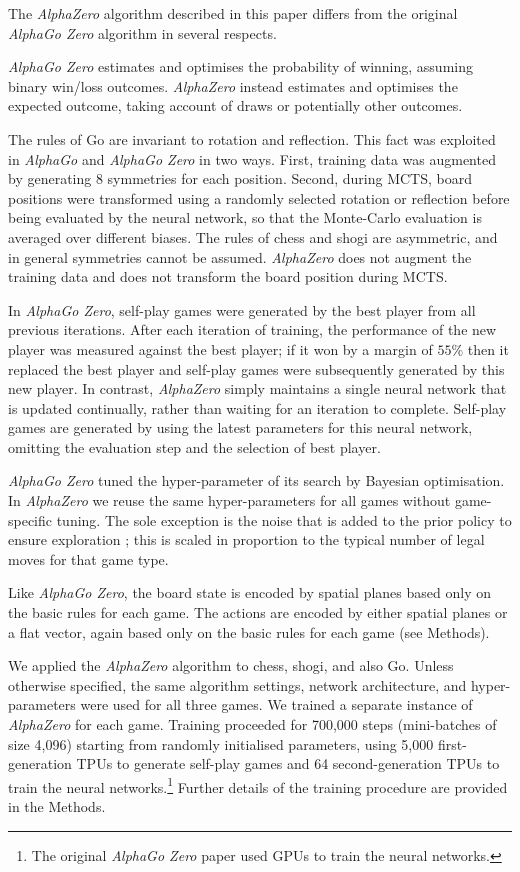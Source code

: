 \documentclass[12pt]{article}
\begin{document}
The \emph{AlphaZero} algorithm described in this paper differs from the original \emph{AlphaGo Zero} algorithm in several respects. 

\emph{AlphaGo Zero} estimates and optimises the probability of winning, assuming binary win/loss outcomes. \emph{AlphaZero} instead estimates and optimises the expected outcome, taking account of draws or potentially other outcomes. 

The rules of Go are invariant to rotation and reflection. This fact was exploited in \emph{AlphaGo} and \emph{AlphaGo Zero} in two ways. First, training data was augmented by generating 8 symmetries for each position. Second, during MCTS, board positions were transformed using a randomly selected rotation or reflection before being evaluated by the neural network, so that the Monte-Carlo evaluation is averaged over different biases. The rules of chess and shogi are asymmetric, and in general symmetries cannot be assumed. \emph{AlphaZero} does not augment the training data and does not transform the board position during MCTS.  

In \emph{AlphaGo Zero}, self-play games were generated by the best player from all previous iterations. After each iteration of training, the performance of the new player was measured against the best player; if it won by a margin of $55\%$ then it replaced the best player and self-play games were subsequently generated by this new player. In contrast, \emph{AlphaZero} simply maintains a single neural network that is updated continually, rather than waiting for an iteration to complete. Self-play games are generated by using the latest parameters for this neural network, omitting the evaluation step and the selection of best player. 

\emph{AlphaGo Zero} tuned the hyper-parameter of its search by Bayesian optimisation. In \emph{AlphaZero} we reuse the same hyper-parameters for all games without game-specific tuning. The sole exception is the noise that is added to the prior policy to ensure exploration \cite{Silver17AG0}; this is scaled in proportion to the typical number of legal moves for that game type.

Like \emph{AlphaGo Zero}, the board state is encoded by spatial planes based only on the basic rules for each game. The actions are encoded by either spatial planes or a flat vector, again based only on the basic rules for each game (see Methods). 



We applied the \emph{AlphaZero} algorithm to chess, shogi, and also Go. Unless otherwise specified, the same algorithm settings, network architecture, and hyper-parameters were used for all three games. We trained a separate instance of \emph{AlphaZero} for each game. Training proceeded for 700,000 steps (mini-batches of size 4,096) starting from randomly initialised parameters, using 5,000 first-generation TPUs \cite{jouppi:tpu} to  generate self-play games and 64 second-generation TPUs to train the neural networks.\footnote{The original \emph{AlphaGo Zero} paper used GPUs to train the neural networks.} Further details of the training procedure are provided in the Methods. 
\end{document}
